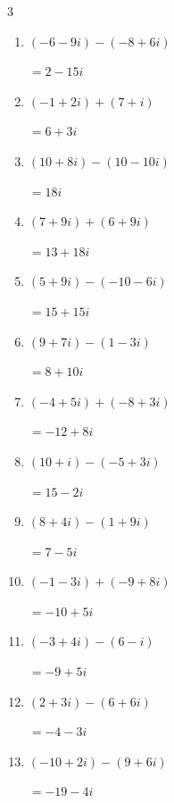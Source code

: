 \begin{multicols}{3}
\begin{enumerate}
        $\displaystyle =-14+i$

  \item $\displaystyle (-6-9i) - (-8+6i)$

        $\displaystyle =2-15i$

  \item $\displaystyle (-1+2i) + (7+i)$

        $\displaystyle =6+3i$

  \item $\displaystyle (10+8i) - (10-10i)$

        $\displaystyle =18i$

\columnbreak %

  \item $\displaystyle (7+9i) + (6+9i)$

        $\displaystyle =13+18i$

  \item $\displaystyle (5+9i) - (-10-6i)$

        $\displaystyle =15+15i$

  \item $\displaystyle (9+7i) - (1-3i)$

        $\displaystyle =8+10i$

  \item $\displaystyle (-4+5i) + (-8+3i)$

        $\displaystyle =-12+8i$

  \item $\displaystyle (10+i) - (-5+3i)$

        $\displaystyle =15-2i$

  \item $\displaystyle (8+4i) - (1+9i)$

        $\displaystyle =7-5i$

  \item $\displaystyle (-1-3i) + (-9+8i)$

        $\displaystyle =-10+5i$

  \item $\displaystyle (-3+4i) - (6-i)$

        $\displaystyle =-9+5i$

  \item $\displaystyle (2+3i) - (6+6i)$

        $\displaystyle =-4-3i$

  \item $\displaystyle (-10+2i) - (9+6i)$

        $\displaystyle =-19-4i$


\end{enumerate}
\end{multicols}
